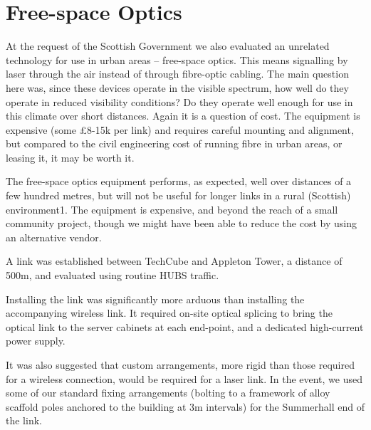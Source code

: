 
\section{Free-space Optics}
\label{sec:fso}

At the request of the Scottish Government we also evaluated an
unrelated technology for use in urban areas – free-space optics. This
means signalling by laser through the air instead of through
fibre-optic cabling. The main question here was, since these devices
operate in the visible spectrum, how well do they operate in reduced
visibility conditions? Do they operate well enough for use in this
climate over short distances. Again it is a question of cost. The
equipment is expensive (some \pounds 8-15k per link) and requires careful
mounting and alignment, but compared to the civil engineering cost of
running fibre in urban areas, or leasing it, it may be worth it.

The free-space optics equipment performs, as expected, well over
distances of a few hundred metres, but will not be useful for longer
links in a rural (Scottish) environment1. The equipment is expensive,
and beyond the reach of a small community project, though we might
have been able to reduce the cost by using an alternative vendor.

A link was established between TechCube and Appleton Tower, a distance
of 500m, and evaluated using routine HUBS traffic.

Installing the link was significantly more arduous than installing the
accompanying wireless link. It required on-site optical splicing to
bring the optical link to the server cabinets at each end-point, and a
dedicated high-current power supply.

It was also suggested that custom arrangements, more rigid than those
required for a wireless connection, would be required for a laser
link. In the event, we used some of our standard fixing arrangements
(bolting to a framework of alloy scaffold poles anchored to the
building at 3m intervals) for the Summerhall end of the link.

